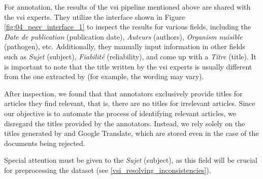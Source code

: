 
For annotation, the results of the \gls{vsi} pipeline mentioned above are shared with the \gls{vsi} experts. They utilize the interface shown in Figure \ref{fig:04_pesv_interface_1} to inspect the results for various fields, including the \emph{Date de publication} (publication date), \emph{Auteurs} (authors), \emph{Organism nuisible} (pathogen), etc. Additionally, they manually input information in other fields such as \emph{Sujet} (subject), \emph{Fiabilité} (reliability), and come up with a \emph{Titre} (title).
It is important to note that the title written by the \gls{vsi} experts is usually different from the one extracted by \trafilatura{} (for example, 
the wording may vary). 

After inspection, we found that that annotators exclusively provide titles for articles they find relevant, that is, there are no titles for irrelevant articles. Since our objective is to automate the process of identifying relevant articles, we disregard the titles provided by the annotators. Instead, we rely solely on the titles generated by \trafilatura{} and Google Translate, which are stored even in the case of the documents being rejected.

Special attention must be given to the \emph{Sujet} (subject), as this field will be crucial for preprocessing the dataset (see \headerName{} \ref{vsi_resolving_inconsistencies}).


